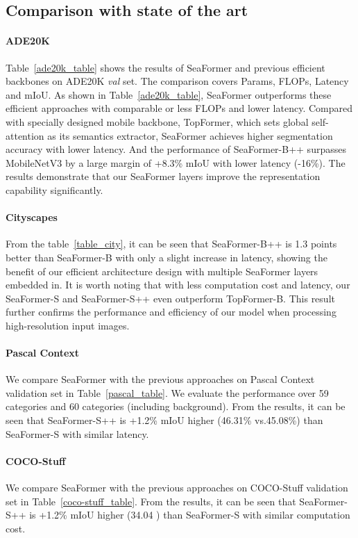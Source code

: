 \subsection{Comparison with state of the art}

\paragraph{ADE20K}
Table~\ref{ade20k_table} shows the results of SeaFormer and previous efficient backbones on ADE20K \textit{val} set. 
The comparison covers Params, FLOPs, Latency and mIoU. 
As shown in Table~\ref{ade20k_table}, SeaFormer outperforms these efficient approaches with comparable or less FLOPs and lower latency. 
Compared with specially designed mobile backbone, TopFormer, which sets global self-attention as its semantics extractor, SeaFormer achieves higher segmentation accuracy with lower latency. 
And the performance of SeaFormer-B++ surpasses MobileNetV3 by a large margin of +8.3\% mIoU with lower latency (-16\%). The results demonstrate that our SeaFormer layers improve the representation capability significantly.



\paragraph{Cityscapes}
From the table~\ref{table_city}, it can be seen that SeaFormer-B++ is 1.3 points better than SeaFormer-B with only a slight increase in latency, showing the benefit of our efficient architecture design with multiple SeaFormer layers embedded in.
It is worth noting that with less computation cost and latency, our SeaFormer-S and SeaFormer-S++ even outperform TopFormer-B. This result further confirms the performance and efficiency of our model when processing high-resolution input images.

\paragraph{Pascal Context}
We compare SeaFormer with the previous approaches on Pascal Context validation set in Table~\ref{pascal_table}. We evaluate the performance over 59 categories and 60 categories (including background). From the results, it can be seen that SeaFormer-S++ is +1.2\% mIoU higher (46.31\% vs.45.08\%) than SeaFormer-S with similar latency. 

\paragraph{COCO-Stuff}
We compare SeaFormer with the previous approaches on COCO-Stuff validation set in Table~\ref{coco-stuff_table}. From the results, it can be seen that SeaFormer-S++ is +1.2\% mIoU higher (34.04 ) than SeaFormer-S with similar computation cost.




